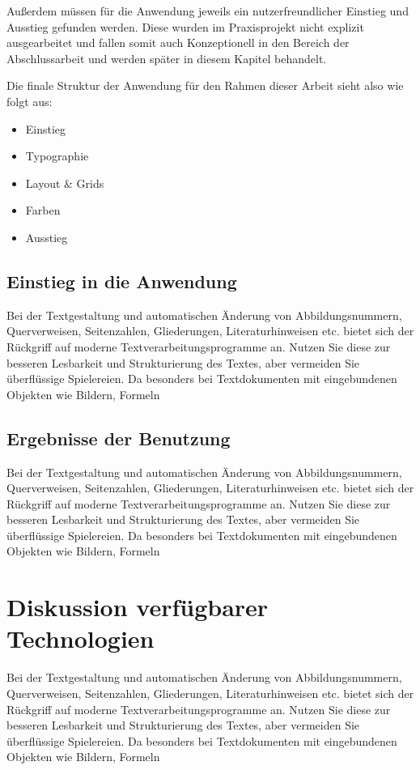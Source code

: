 Außerdem müssen für die Anwendung jeweils ein nutzerfreundlicher Einstieg und Ausstieg gefunden werden. Diese wurden im Praxisprojekt nicht explizit ausgearbeitet und fallen somit auch Konzeptionell in den Bereich der Abschlussarbeit und werden später in diesem Kapitel behandelt.

Die finale Struktur der Anwendung für den Rahmen dieser Arbeit sieht also wie folgt aus:

\begin{itemize}
  \item Einstieg
  \item Typographie
  \item Layout \& Grids
  \item Farben
  \item Ausstieg
\end{itemize}

\subsection{Einstieg in die Anwendung}
Bei der Textgestaltung und automatischen Änderung von Abbildungsnummern, Querverweisen,
Seitenzahlen, Gliederungen, Literaturhinweisen etc. bietet sich der Rückgriff
auf moderne Textverarbeitungsprogramme an. Nutzen Sie diese zur besseren Lesbarkeit
und Strukturierung des Textes, aber vermeiden Sie überflüssige Spielereien. Da
besonders bei Textdokumenten mit eingebundenen Objekten wie Bildern, Formeln

\subsection{Ergebnisse der Benutzung}
Bei der Textgestaltung und automatischen Änderung von Abbildungsnummern, Querverweisen,
Seitenzahlen, Gliederungen, Literaturhinweisen etc. bietet sich der Rückgriff
auf moderne Textverarbeitungsprogramme an. Nutzen Sie diese zur besseren Lesbarkeit
und Strukturierung des Textes, aber vermeiden Sie überflüssige Spielereien. Da
besonders bei Textdokumenten mit eingebundenen Objekten wie Bildern, Formeln

\section{Diskussion verfügbarer Technologien}
Bei der Textgestaltung und automatischen Änderung von Abbildungsnummern, Querverweisen,
Seitenzahlen, Gliederungen, Literaturhinweisen etc. bietet sich der Rückgriff
auf moderne Textverarbeitungsprogramme an. Nutzen Sie diese zur besseren Lesbarkeit
und Strukturierung des Textes, aber vermeiden Sie überflüssige Spielereien. Da
besonders bei Textdokumenten mit eingebundenen Objekten wie Bildern, Formeln

